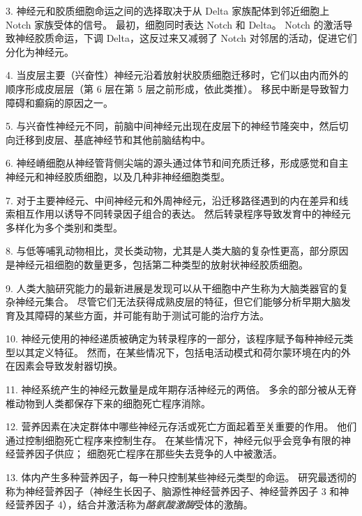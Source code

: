 3. 神经元和胶质细胞命运之间的选择取决于从 Delta 家族配体到邻近细胞上 Notch 家族受体的信号。
最初，细胞同时表达 Notch 和 Delta。
Notch 的激活导致神经胶质命运，下调 Delta，这反过来又减弱了 Notch 对邻居的活动，促进它们分化为神经元。


4. 当皮层主要（兴奋性）神经元沿着放射状胶质细胞迁移时，它们以由内而外的顺序形成皮层层（第 6 层在第 5 层之前形成，依此类推）。
移民中断是导致智力障碍和癫痫的原因之一。


5. 与兴奋性神经元不同，前脑中间神经元出现在皮层下的神经节隆突中，然后切向迁移到皮层、基底神经节和其他前脑结构中。


6. 神经嵴细胞从神经管背侧尖端的源头通过体节和间充质迁移，形成感觉和自主神经元和神经胶质细胞，以及几种非神经细胞类型。


7. 对于主要神经元、中间神经元和外周神经元，沿迁移路径遇到的内在差异和线索相互作用以诱导不同转录因子组合的表达。
然后转录程序导致发育中的神经元多样化为多个类别和类型。


8. 与低等哺乳动物相比，灵长类动物，尤其是人类大脑的复杂性更高，部分原因是神经元祖细胞的数量更多，包括第二种类型的放射状神经胶质细胞。


9. 人类大脑研究能力的最新进展是发现可以从干细胞中产生称为大脑类器官的复杂神经元集合。
尽管它们无法获得成熟皮层的特征，但它们能够分析早期大脑发育及其障碍的某些方面，并可能有助于测试可能的治疗方法。


10. 神经元使用的神经递质被确定为转录程序的一部分，该程序赋予每种神经元类型以其定义特征。
然而，在某些情况下，包括电活动模式和荷尔蒙环境在内的外在因素会导致发射器切换。


11. 神经系统产生的神经元数量是成年期存活神经元的两倍。
多余的部分被从无脊椎动物到人类都保存下来的细胞死亡程序消除。


12. 营养因素在决定群体中哪些神经元存活或死亡方面起着至关重要的作用。
他们通过控制细胞死亡程序来控制生存。
在某些情况下，神经元似乎会竞争有限的神经营养因子供应；
细胞死亡程序在那些失去竞争的人中被激活。 


13. 体内产生多种营养因子，每一种只控制某些神经元类型的命运。
研究最透彻的称为神经营养因子（神经生长因子、脑源性神经营养因子、神经营养因子 3 和神经营养因子 4），结合并激活称为\textit{酪氨酸激酶}受体的激酶。


